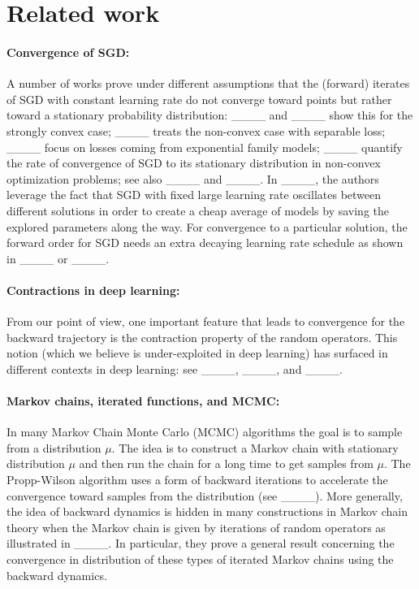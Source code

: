 \section{Related work}
\label{section:related_work}

\paragraph{Convergence of SGD:}
A number of works prove under different assumptions that the (forward) iterates of SGD with constant learning rate do not converge toward points but rather toward a stationary probability distribution: ____ and ____ show this for the strongly convex case; ____ treats the non-convex case with separable loss; ____ focus on losses coming from exponential family models; ____ quantify the rate of convergence of SGD to its stationary distribution in non-convex optimization problems; see also ____ and ____. In ____, the authors leverage the fact that SGD with fixed large learning rate oscillates between different solutions in order to create a cheap average of models by saving the explored parameters along the way. For convergence to a particular solution, the forward order for SGD needs an extra decaying learning rate schedule as shown in ____ or ____.

\paragraph{Contractions in deep learning:} 
From our point of view, one important feature that leads to convergence for the backward trajectory is the contraction property of the random operators. This notion (which we believe is under-exploited in deep learning) has surfaced in different contexts in deep learning: see ____, ____, and ____. 

\paragraph{Markov chains, iterated functions, and MCMC:}
In many Markov Chain Monte Carlo (MCMC) algorithms the goal is to sample from a distribution $\mu$. The idea is to construct a Markov chain with stationary distribution $\mu$ and then run the chain for a long time to get samples from $\mu$. The Propp-Wilson algorithm uses a form of backward iterations to accelerate the convergence toward samples from the distribution (see ____). More generally, the idea of backward dynamics is hidden in many constructions in Markov chain theory when the Markov chain is given by iterations of random operators as illustrated in ____. In particular, they prove a general result concerning the convergence in distribution of these types of iterated Markov chains using the backward dynamics.

